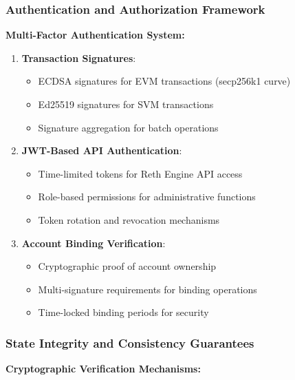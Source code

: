 \documentclass[11pt,a4paper]{article}
\begin{document}
\subsubsection{Authentication and Authorization Framework}

\textbf{Multi-Factor Authentication System:}
\begin{enumerate}
    \item \textbf{Transaction Signatures}:
    \begin{itemize}
        \item ECDSA signatures for EVM transactions (secp256k1 curve)
        \item Ed25519 signatures for SVM transactions
        \item Signature aggregation for batch operations
    \end{itemize}
    
    \item \textbf{JWT-Based API Authentication}:
    \begin{itemize}
        \item Time-limited tokens for Reth Engine API access
        \item Role-based permissions for administrative functions
        \item Token rotation and revocation mechanisms
    \end{itemize}
    
    \item \textbf{Account Binding Verification}:
    \begin{itemize}
        \item Cryptographic proof of account ownership
        \item Multi-signature requirements for binding operations
        \item Time-locked binding periods for security
    \end{itemize}
\end{enumerate}

\subsubsection{State Integrity and Consistency Guarantees}

\textbf{Cryptographic Verification Mechanisms:}
\end{document}
